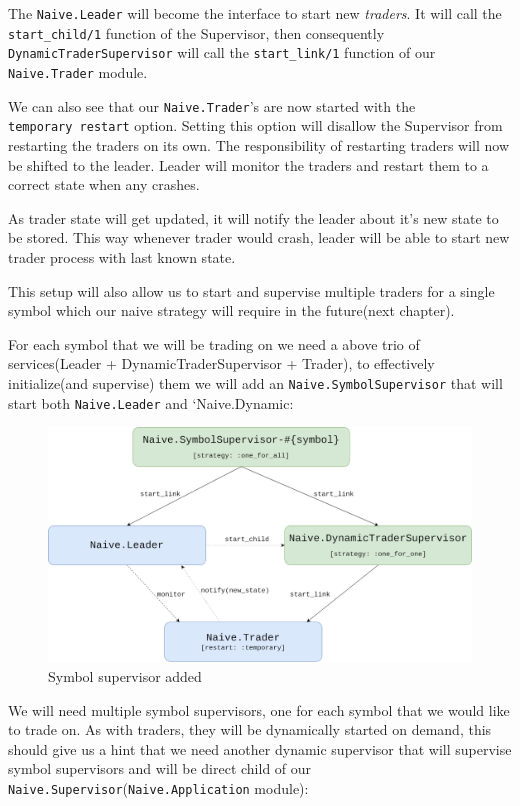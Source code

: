 \documentclass[
]{book}
\begin{document}
The \texttt{Naive.Leader} will become the interface to start new \emph{traders}. It will call the \texttt{start\_child/1} function of the Supervisor, then consequently \texttt{DynamicTraderSupervisor} will call the \texttt{start\_link/1} function of our \texttt{Naive.Trader} module.

We can also see that our \texttt{Naive.Trader}'s are now started with the \texttt{temporary\ restart} option. Setting this option will disallow the Supervisor from restarting the traders on its own. The responsibility of restarting traders will now be shifted to the leader. Leader will monitor the traders and restart them to a correct state when any crashes.

As trader state will get updated, it will notify the leader about it's new state to be stored. This way whenever trader would crash, leader will be able to start new trader process with last known state.

This setup will also allow us to start and supervise multiple traders for a single symbol which our naive strategy will require in the future(next chapter).

For each symbol that we will be trading on we need a above trio of services(Leader + DynamicTraderSupervisor + Trader), to effectively initialize(and supervise) them we will add an \texttt{Naive.SymbolSupervisor} that will start both \texttt{Naive.Leader} and `Naive.Dynamic:

\begin{figure}
\centering
\includegraphics{images/chapter_05_04_symbol_sup.png}
\caption{Symbol supervisor added}
\end{figure}

We will need multiple symbol supervisors, one for each symbol that we would like to trade on. As with traders, they will be dynamically started on demand, this should give us a hint that we need another dynamic supervisor that will supervise symbol supervisors and will be direct child of our \texttt{Naive.Supervisor}(\texttt{Naive.Application} module):
\end{document}
